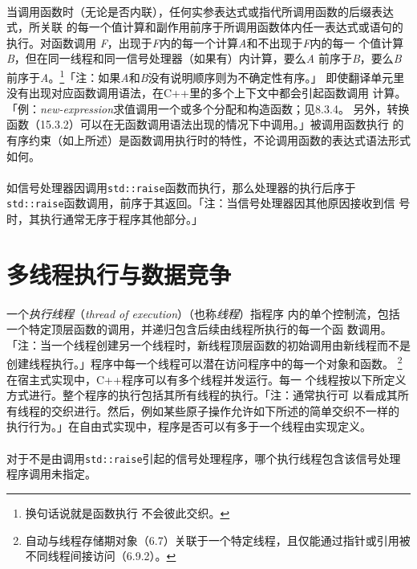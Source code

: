\paragraph{}
当调用函数时（无论是否内联），任何实参表达式或指代所调用函数的后缀表达式，所关联
的每一个值计算和副作用前序于所调用函数体内任一表达式或语句的执行。对函数调用
\textit{F}，出现于\textit{F}内的每一个计算\textit{A}和不出现于\textit{F}内的每一
个值计算\textit{B}，但在同一线程和同一信号处理器（如果有）内计算，要么\textit{A}
前序于\textit{B}，要么\textit{B}前序于\textit{A}。\footnote{换句话说就是函数执行
不会彼此交织。}「注：如果\textit{A}和\textit{B}没有说明顺序则为不确定性有序。」
即使翻译单元里没有出现对应函数调用语法，在C++里的多个上下文中都会引起函数调用
计算。「例：\textit{new-expression}求值调用一个或多个分配和构造函数；见8.3.4。
另外，转换函数（15.3.2）可以在无函数调用语法出现的情况下中调用。」被调用函数执行
的有序约束（如上所述）是函数调用执行时的特性，不论调用函数的表达式语法形式如何。

\paragraph{}
如信号处理器因调用\texttt{std::raise}函数而执行，那么处理器的执行后序于
\texttt{std::raise}函数调用，前序于其返回。「注：当信号处理器因其他原因接收到信
号时，其执行通常无序于程序其他部分。」

\section{多线程执行与数据竞争}
\paragraph{}
一个\textit{执行线程}（\textit{thread of execution}）（也称\textit{线程}）指程序
内的单个控制流，包括一个特定顶层函数的调用，并递归包含后续由线程所执行的每一个函
数调用。「注：当一个线程创建另一个线程时，新线程顶层函数的初始调用由新线程而不是
创建线程执行。」程序中每一个线程可以潜在访问程序中的每一个对象和函数。
\footnote{自动与线程存储期对象（6.7）关联于一个特定线程，且仅能通过指针或引用被
不同线程间接访问（6.9.2）。} 在宿主式实现中，C++程序可以有多个线程并发运行。每一
个线程按以下所定义方式进行。整个程序的执行包括其所有线程的执行。「注：通常执行可
以看成其所有线程的交织进行。然后，例如某些原子操作允许如下所述的简单交织不一样的
执行行为。」在自由式实现中，程序是否可以有多于一个线程由实现定义。

\paragraph{}
对于不是由调用\texttt{std::raise}引起的信号处理程序，哪个执行线程包含该信号处理
程序调用未指定。

